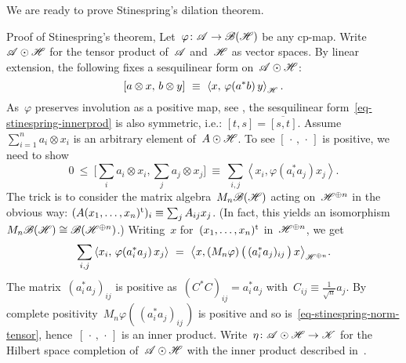 \documentclass[b]{subfiles}
\begin{document}
\begin{parsec}%
\begin{point}%
We are ready to prove Stinespring's dilation theorem.
\begin{point}{%
    Proof of Stinespring's theorem, }%
Let~$\varphi\colon \mathscr{A} \to \mathscr{B}(\mathscr{H})$
    be any cp-map.
Write~$\mathscr{A} \odot \mathscr{H}$ for the tensor product of~$\mathscr{A}$ and~$\mathscr{H}$
    as vector spaces.
By linear extension,
the following fixes a sesquilinear form on~$\mathscr{A} \odot \mathscr{H}$:
\begin{equation}\label{eq-stinespring-innerprod}
    [a\otimes x,\, b \otimes y] \ \equiv\  \left<x, \,\varphi(a^*b)\, y\right>_{\mathscr{H}}.
\end{equation}
As~$\varphi$ preserves involution as a positive map,
see ,
the sesquilinear form~\eqref{eq-stinespring-innerprod}
is also symmetric, i.e.: $[t,s]=\overline{[s,t]}$.
    Assume~$\sum^n_{i=1} a_i\otimes x_i$
is an arbitrary element of~$A \odot \mathscr{H}$.
To see $[\,\cdot\,,\,\cdot\,]$ is positive,
we need to show
\begin{equation*}
    0 \ \leq\  \bigl[\sum_i a_i\otimes x_i, \sum_j a_j\otimes x_j\bigr]
        \ \equiv\  \sum_{i,j} \left< x_i, \varphi(a_i^*a_j) x_j \right>.
\end{equation*}
The trick is to consider the matrix algebra~$M_n\mathscr{B}(\mathscr{H})$
acting on~$\mathscr{H}^{\oplus n}$ in the obvious way:
$(A (x_1,\ldots,x_n)^{\mathrm{t}})_i \equiv \sum_j A_{ij} x_j$.
(In fact, this yields an
    isomorphism~$M_n\mathscr{B}(\mathscr{H}) \cong \mathscr{B}(\mathscr{H}^{\oplus n})$.)
Writing~$x$ for~$(x_1,\ldots,x_n)^{\mathrm{t}}$ in~$\mathscr{H}^{\oplus n}$,
    we get
\begin{equation}\label{eq-stinespring-norm-tensor}
    \sum_{i,j} \left< x_i, \,\varphi(a_i^*a_j)\, x_j \right>
    \ =\  \bigl<
    x,
    (M_n\varphi) \,\bigl(\, (a_i^*a_j)_{ij} \, \bigr)\,
    x \bigr>_{\mathscr{H}^{\oplus n}}.
\end{equation}
The matrix~$(a_i^*a_j)_{ij}$
is positive as~$(C^*C)_{ij} = a_i^*a_j$
    with~$C_{ij} \equiv \frac{1}{\sqrt{n}} a_j$.
    By complete positivity~$M_n\varphi(\,(a_i^*a_j)_{ij}\,)$ is positive
    and so is~\eqref{eq-stinespring-norm-tensor},
    hence~$[\,\cdot\,,\,\cdot\,]$ is an inner product.
Write~$\eta\colon \mathscr{A}\odot \mathscr{H} \to \mathscr{K}$ for the Hilbert space completion
    of~$\mathscr{A} \odot \mathscr{H}$ with the inner product
    described in~.
\begin{point}%

\end{point}
\end{point}
\end{point}
\end{parsec}
\end{document}
